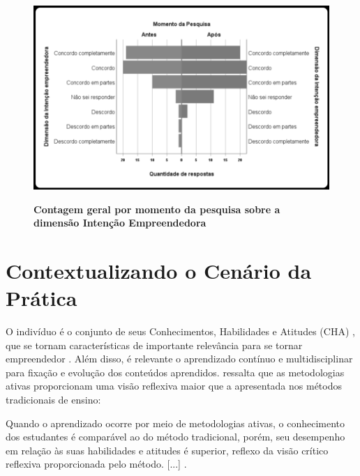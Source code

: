 \begin{figure}[H]
\centering
\caption{\textbf{Contagem geral por momento da pesquisa sobre a dimensão Intenção Empreendedora}}
\includegraphics[scale=0.4]{Imagens/intencao_empreendedora.png}
\label{figura_45}
\end{figure}

\section{Contextualizando o Cenário da Prática}

O indivíduo é o conjunto de seus Conhecimentos, Habilidades e Atitudes (CHA) \cite{dutra_competencias_2004}, que se tornam características de importante relevância para se tornar empreendedor \cite{ferreira_conhecimento_2019}. Além disso, é relevante o aprendizado contínuo e multidisciplinar para fixação e evolução dos conteúdos aprendidos.  ressalta que as metodologias ativas proporcionam uma visão reflexiva maior que a apresentada nos métodos tradicionais de ensino:

\begin{citacao}
[...] Quando o aprendizado ocorre por meio de metodologias ativas, o conhecimento dos estudantes é comparável ao do método tradicional, porém, seu desempenho em relação às suas habilidades e atitudes é superior, reflexo da visão crítico reflexiva proporcionada pelo método. [...] \cite{limberger_metodologias_2013}.
\end{citacao}


